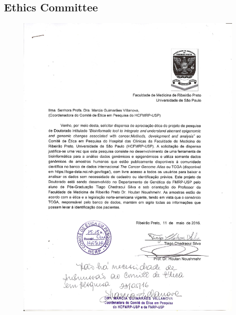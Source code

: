 \documentclass[doutorado, spanish, brazil, english,pos-defesa]{packages/icmc}
\begin{document}

\begin{apendicesenv}

    \chapter{Ethics Committee}
    \vspace{-2cm}
    \begin{figure}[h!]
    \begin{center}
    \includegraphics[scale=0.65]{images/dispensa_comite0001.pdf}
    \end{center}
    \end{figure}
%    

%    

\end{apendicesenv}



\begin{anexosenv}

\end{anexosenv}
\end{document}
